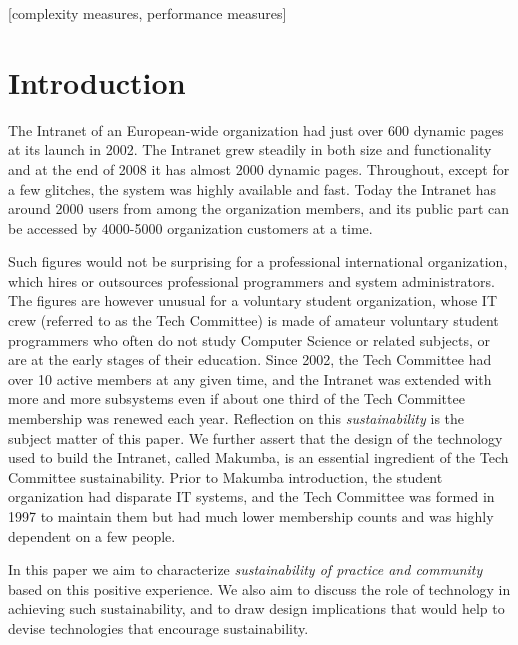 \documentclass{acm_proc_article-sp}
\begin{document}
[complexity measures, performance measures]


\section{Introduction}\label{sec:introduction}
The Intranet of an European-wide organization had just over 600 dynamic pages at its launch in 2002. The Intranet grew steadily in both size and functionality and at the end of 2008 it has almost 2000 dynamic pages. Throughout, except for a few glitches, the system was highly available and fast. Today the Intranet has around 2000 users from among the organization members, and its public part can be accessed by 4000-5000 organization customers at a time.

Such figures would not be surprising for a professional international organization, which hires or outsources professional programmers and system administrators. 
The figures are however unusual for a voluntary student organization, whose IT crew (referred to as the Tech Committee) is made of amateur voluntary student programmers who often do not study Computer Science or related subjects, or are at the early stages of their education.  
Since 2002, the Tech Committee had over 10 active members at any given time, and the Intranet was extended with more and more subsystems even if about one third of the Tech Committee membership was renewed each year. Reflection on this {\it sustainability} is the subject matter of this paper. We further assert that the design of the technology used to build the Intranet, called Makumba, is an essential ingredient of the Tech Committee sustainability.
Prior to Makumba introduction, the student organization had disparate IT systems, and the Tech Committee was formed in 1997 to maintain them but had much lower membership counts and was highly dependent on a few people.

In this paper we aim to characterize {\it sustainability of practice and community} based on this positive experience. We also aim to discuss the role of technology in achieving such sustainability, and to draw design implications that would help to devise technologies that encourage sustainability. 
\end{document}
